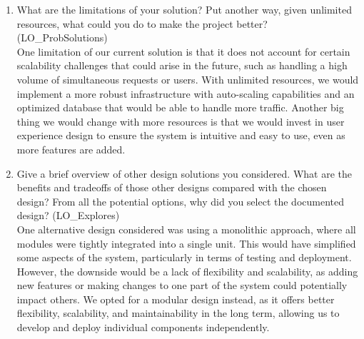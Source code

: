 \documentclass[12pt, titlepage]{article}
\begin{document}
\begin{enumerate}
  \item What are the limitations of your solution?  Put another way, given
  unlimited resources, what could you do to make the project better? (LO\_ProbSolutions)\\
One limitation of our current solution is that it does not account for certain scalability challenges that could arise in the future, such as handling a high volume of simultaneous requests or users. With unlimited resources, we would implement a more robust infrastructure with auto-scaling capabilities and an optimized database that would be able to handle more traffic. Another big thing we would change with more resources is that we would invest in user experience design to ensure the system is intuitive and easy to use, even as more features are added.

  \item Give a brief overview of other design solutions you considered.  What
  are the benefits and tradeoffs of those other designs compared with the chosen
  design?  From all the potential options, why did you select the documented design?
  (LO\_Explores)\\
One alternative design considered was using a monolithic approach, where all modules were tightly integrated into a single unit. This would have simplified some aspects of the system, particularly in terms of testing and deployment. However, the downside would be a lack of flexibility and scalability, as adding new features or making changes to one part of the system could potentially impact others. We opted for a modular design instead, as it offers better flexibility, scalability, and maintainability in the long term, allowing us to develop and deploy individual components independently.
\end{enumerate}
\end{document}

